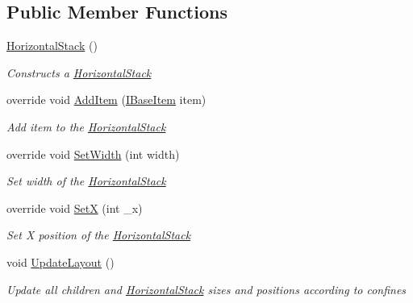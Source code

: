 \subsection*{Public Member Functions}
\begin{DoxyCompactItemize}
\item 
\mbox{\hyperlink{class_space_v_i_l_1_1_horizontal_stack_a78e62c1bfb7614d2c3e7c2389d9a676d}{Horizontal\+Stack}} ()
\begin{DoxyCompactList}\small\item\em Constructs a \mbox{\hyperlink{class_space_v_i_l_1_1_horizontal_stack}{Horizontal\+Stack}} \end{DoxyCompactList}\item 
override void \mbox{\hyperlink{class_space_v_i_l_1_1_horizontal_stack_a159639b3438702fb5b97e78045406f0d}{Add\+Item}} (\mbox{\hyperlink{interface_space_v_i_l_1_1_core_1_1_i_base_item}{I\+Base\+Item}} item)
\begin{DoxyCompactList}\small\item\em Add item to the \mbox{\hyperlink{class_space_v_i_l_1_1_horizontal_stack}{Horizontal\+Stack}} \end{DoxyCompactList}\item 
override void \mbox{\hyperlink{class_space_v_i_l_1_1_horizontal_stack_aa0650cd4cc25c1471f7b31748a6fd7e1}{Set\+Width}} (int width)
\begin{DoxyCompactList}\small\item\em Set width of the \mbox{\hyperlink{class_space_v_i_l_1_1_horizontal_stack}{Horizontal\+Stack}} \end{DoxyCompactList}\item 
override void \mbox{\hyperlink{class_space_v_i_l_1_1_horizontal_stack_abfcfb03003ed514e6262ae9004688477}{SetX}} (int \+\_\+x)
\begin{DoxyCompactList}\small\item\em Set X position of the \mbox{\hyperlink{class_space_v_i_l_1_1_horizontal_stack}{Horizontal\+Stack}} \end{DoxyCompactList}\item 
void \mbox{\hyperlink{class_space_v_i_l_1_1_horizontal_stack_ace785e253da273b8eb7d247506f2e747}{Update\+Layout}} ()
\begin{DoxyCompactList}\small\item\em Update all children and \mbox{\hyperlink{class_space_v_i_l_1_1_horizontal_stack}{Horizontal\+Stack}} sizes and positions according to confines \end{DoxyCompactList}\end{DoxyCompactItemize}
